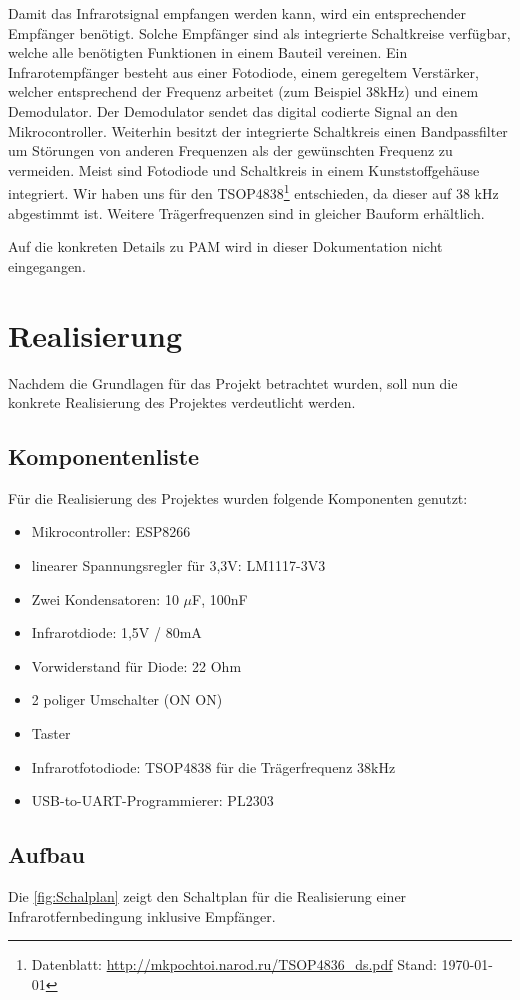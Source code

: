 Damit das Infrarotsignal empfangen werden kann, wird ein entsprechender Empfänger benötigt.
Solche Empfänger sind als integrierte Schaltkreise verfügbar, welche alle benötigten Funktionen in einem Bauteil vereinen.
Ein Infrarotempfänger besteht aus einer Fotodiode, einem geregeltem Verstärker, welcher entsprechend der Frequenz arbeitet (zum Beispiel 38kHz) und einem Demodulator.
Der Demodulator sendet das digital codierte Signal an den Mikrocontroller.
Weiterhin besitzt der integrierte Schaltkreis einen Bandpassfilter um Störungen von anderen Frequenzen als der gewünschten Frequenz zu vermeiden.
Meist sind Fotodiode und Schaltkreis in einem Kunststoffgehäuse integriert.
Wir haben uns für den TSOP4838\footnote{Datenblatt: \url{http://mkpochtoi.narod.ru/TSOP4836_ds.pdf} Stand: \today} entschieden, da dieser auf 38 kHz abgestimmt ist. Weitere Trägerfrequenzen sind in gleicher Bauform erhältlich.

Auf die konkreten Details zu \acs{PAM} wird in dieser Dokumentation nicht eingegangen.

\section{Realisierung}
Nachdem die Grundlagen für das Projekt betrachtet wurden, soll nun die konkrete Realisierung des Projektes verdeutlicht werden.
\subsection{Komponentenliste}
Für die Realisierung des Projektes wurden folgende Komponenten genutzt:
\begin{itemize}
	\item Mikrocontroller: ESP8266
	\item linearer Spannungsregler für 3,3V: LM1117-3V3
	\item Zwei Kondensatoren: 10 $\mu$F, 100nF
	\item Infrarotdiode: 1,5V / 80mA
	\item Vorwiderstand für Diode: 22 Ohm
	\item 2 poliger Umschalter (ON ON)
	\item Taster
	\item Infrarotfotodiode: TSOP4838 für die Trägerfrequenz 38kHz
	\item USB-to-UART-Programmierer: PL2303
\end{itemize}


\subsection{Aufbau}
Die \autoref{fig:Schalplan} zeigt den Schaltplan für die Realisierung einer Infrarotfernbedingung inklusive Empfänger.

